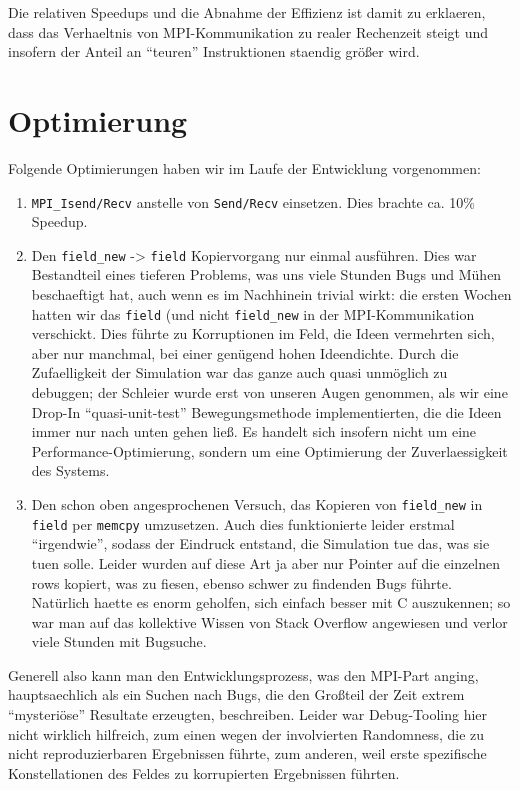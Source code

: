 Die relativen Speedups und die Abnahme der Effizienz ist damit zu
erklaeren, dass das Verhaeltnis von MPI-Kommunikation zu realer
Rechenzeit steigt und insofern der Anteil an ``teuren'' Instruktionen
staendig größer wird.

\section{Optimierung}\label{optimierung}

Folgende Optimierungen haben wir im Laufe der Entwicklung vorgenommen:

\begin{enumerate}
\def\labelenumi{\arabic{enumi}.}
\itemsep1pt\parskip0pt
\item
  \texttt{MPI\_Isend/Recv} anstelle von \texttt{Send/Recv} einsetzen.
  Dies brachte ca. 10\% Speedup.
\item
  Den \texttt{field\_new} -\textgreater{} \texttt{field} Kopiervorgang
  nur einmal ausführen. Dies war Bestandteil eines tieferen Problems,
  was uns viele Stunden Bugs und Mühen beschaeftigt hat, auch wenn es im
  Nachhinein trivial wirkt: die ersten Wochen hatten wir das
  \texttt{field} (und nicht \texttt{field\_new} in der MPI-Kommunikation
  verschickt. Dies führte zu Korruptionen im Feld, die Ideen vermehrten
  sich, aber nur manchmal, bei einer genügend hohen Ideendichte. Durch
  die Zufaelligkeit der Simulation war das ganze auch quasi unmöglich zu
  debuggen; der Schleier wurde erst von unseren Augen genommen, als wir
  eine Drop-In ``quasi-unit-test'' Bewegungsmethode implementierten, die
  die Ideen immer nur nach unten gehen ließ. Es handelt sich insofern
  nicht um eine Performance-Optimierung, sondern um eine Optimierung der
  Zuverlaessigkeit des Systems.
\item
  Den schon oben angesprochenen Versuch, das Kopieren von
  \texttt{field\_new} in \texttt{field} per \texttt{memcpy} umzusetzen.
  Auch dies funktionierte leider erstmal ``irgendwie'', sodass der
  Eindruck entstand, die Simulation tue das, was sie tuen solle. Leider
  wurden auf diese Art ja aber nur Pointer auf die einzelnen rows
  kopiert, was zu fiesen, ebenso schwer zu findenden Bugs führte.
  Natürlich haette es enorm geholfen, sich einfach besser mit C
  auszukennen; so war man auf das kollektive Wissen von Stack Overflow
  angewiesen und verlor viele Stunden mit Bugsuche.
\end{enumerate}

Generell also kann man den Entwicklungsprozess, was den MPI-Part anging,
hauptsaechlich als ein Suchen nach Bugs, die den Großteil der Zeit
extrem ``mysteriöse'' Resultate erzeugten, beschreiben. Leider war
Debug-Tooling hier nicht wirklich hilfreich, zum einen wegen der
involvierten Randomness, die zu nicht reproduzierbaren Ergebnissen
führte, zum anderen, weil erste spezifische Konstellationen des Feldes
zu korrupierten Ergebnissen führten.

